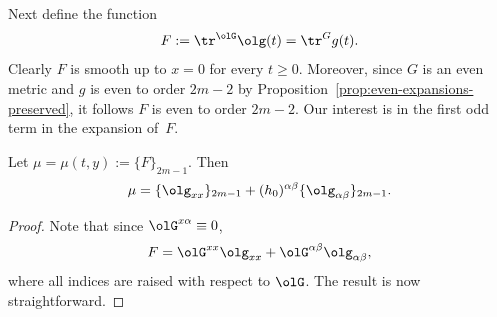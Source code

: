 Next define the function
\begin{gather*}%
F := \tr^{\olG} \olg(t) = \tr^{G} g(t).
\end{gather*}
Clearly $F$ is smooth up to $x=0$ for every $t \geq 0$. Moreover, since $G$ is an even metric and $g$ is even to order $2m-2$ by Proposition~\ref{prop:even-expansions-preserved}, it follows $F$ is even to order $2m-2$. Our interest is in the first odd term in the expansion of~$F$.

\begin{Lemma}\label{lemma3.2} Let $\mu = \mu(t,y) := \{F\}_{2m-1}$. Then
\begin{gather*}%
\mu = \{\olg_{xx}\}_{2m-1} + (h_0)^{\alpha\beta} \{\olg_{\alpha \beta} \}_{2m-1}.
\end{gather*}
\end{Lemma}
\begin{proof}
Note that since $\olG^{x\alpha} \equiv 0$,
\begin{gather*}
\label{eq3.4}
F = \olG^{xx}\olg_{xx} + \olG^{\alpha \beta} \olg_{\alpha \beta},
\end{gather*}
where all indices are raised with respect to $\olG$. The result is now straightforward.
\end{proof}

